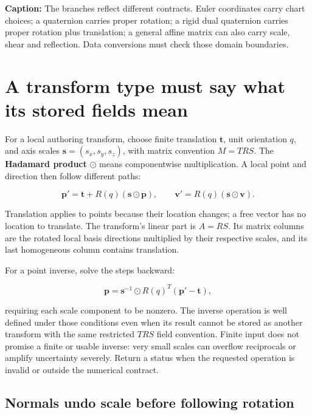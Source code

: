 \textbf{Caption:} The branches reflect different contracts. Euler coordinates carry chart choices; a quaternion carries proper rotation; a rigid dual quaternion carries proper rotation plus translation; a general affine matrix can also carry scale, shear and reflection. Data conversions must check those domain boundaries.

\section{A transform type must say what its stored fields mean}\label{01-foundations-i-ch019-a-transform-type-must-say-what-its-stored-fields-mean}

\hypertarget{01-foundations-i-ch019-a-transform-type-must-say-what-its-stored-fields-mean}{}

For a local authoring transform, choose finite translation \(\mathbf t\), unit orientation \(q\), and axis scales \(\mathbf s=(s_x,s_y,s_z)\), with matrix convention \(M=TRS\). The \textbf{Hadamard product} \(\odot\) means componentwise multiplication. A local point and direction then follow different paths:

\[
\mathbf p'=\mathbf t+R(q)(\mathbf s\odot\mathbf p),
\qquad
\mathbf v'=R(q)(\mathbf s\odot\mathbf v).
\]

Translation applies to points because their location changes; a free vector has no location to translate. The transform's linear part is \(A=RS\). Its matrix columns are the rotated local basis directions multiplied by their respective scales, and its last homogeneous column contains translation.

For a point inverse, solve the steps backward:

\[
\mathbf p=\mathbf s^{-1}\odot R(q)^T(\mathbf p'-\mathbf t),
\]

requiring each scale component to be nonzero. The inverse operation is well defined under those conditions even when its result cannot be stored as another transform with the same restricted \(TRS\) field convention. Finite input does not promise a finite or usable inverse: very small scales can overflow reciprocals or amplify uncertainty severely. Return a status when the requested operation is invalid or outside the numerical contract.

\subsection{Normals undo scale before following rotation}\label{01-foundations-i-ch019-normals-undo-scale-before-following-rotation}

